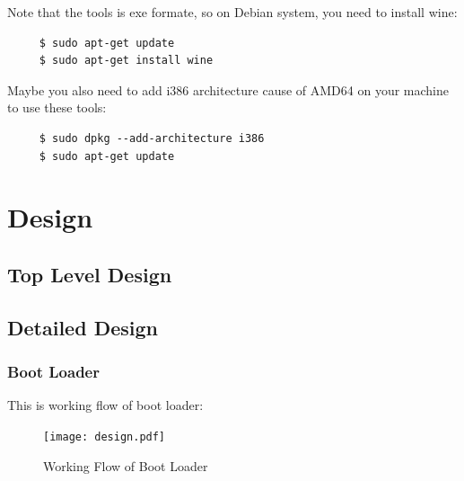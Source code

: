 \documentclass{swfcthesisp}
\begin{document}
Note that the tools is exe formate, so on Debian system, you need to install wine:
\begin{lstlisting}
     $ sudo apt-get update
     $ sudo apt-get install wine
\end{lstlisting}

Maybe you also need to add i386 architecture cause of AMD64 on your machine to use \hspace*{0.8cm}these tools:
\begin{lstlisting}
     $ sudo dpkg --add-architecture i386
     $ sudo apt-get update
\end{lstlisting}

\chapter{Design}

\section{Top Level Design}
\label{sec:top-level-design}

\section{Detailed Design}
\label{sec:detailed-design}

\subsection{Boot Loader}
\label{sec:boot-loader}
This is working flow of boot loader:
\begin{figure}[!ht]
  \centering
  \texttt{[image: design.pdf]}
  \caption{Working Flow of Boot Loader}
  \label{fig:working-flow-boot-loader}
\end{figure}
\end{document}
